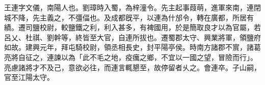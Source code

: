 \begin{pinyinscope}
 
 
 王連字文儀，南陽人也。劉璋時入蜀，為梓潼令。先主起事葭萌，進軍來南，連閉城不降，先主義之，不彊偪也。及成都旣平，以連為什邡令，轉在廣都，所居有績。遷司鹽校尉，較鹽鐵之利，利入甚多，有裨國用，於是簡取良才以為官屬，若呂乂、杜祺、劉幹等，終皆至大官，自連所拔也。遷蜀郡太守、興業將軍，領鹽府如故。建興元年，拜屯騎校尉，領丞相長史，封平陽亭侯。時南方諸郡不賔，諸葛亮將自征之，連諫以為「此不毛之地，疫癘之鄉，不宜以一國之望，冒險而行」。亮慮諸將才不及己，意欲必往，而連言輒懇至，故停留者乆之。會連卒。子山嗣，官至江陽太守。
 
 
\end{pinyinscope}